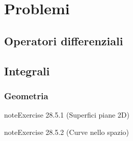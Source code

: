 \documentclass[letterpaper,10pt,italian]{jupyterBook}
\begin{document}
\sphinxstepscope


\section{Problemi}
\label{\detokenize{ch/vector-calculus/problems:problemi}}\label{\detokenize{ch/vector-calculus/problems:vector-calculus-problems}}\label{\detokenize{ch/vector-calculus/problems::doc}}

\subsection{Operatori differenziali}
\label{\detokenize{ch/vector-calculus/problems:operatori-differenziali}}\label{\detokenize{ch/vector-calculus/problems:vector-calculus-problems-derivatives}}

\subsection{Integrali}
\label{\detokenize{ch/vector-calculus/problems:integrali}}\label{\detokenize{ch/vector-calculus/problems:vector-calculus-problems-integrals}}

\subsubsection{Geometria}
\label{\detokenize{ch/vector-calculus/problems:geometria}}\label{\detokenize{ch/vector-calculus/problems:vector-calculus-problems-integrals-geometery}} \label{exercise:ch/vector-calculus/problems-exercise-0}

\begin{sphinxadmonition}{note}{Exercise 28.5.1 (Superfici piane \sphinxhyphen{} 2D)}


\end{sphinxadmonition}
 \label{exercise:ch/vector-calculus/problems-exercise-1}

\begin{sphinxadmonition}{note}{Exercise 28.5.2 (Curve nello spazio)}


\end{sphinxadmonition}
 \label{exercise:ch/vector-calculus/problems-exercise-2}
\end{document}
